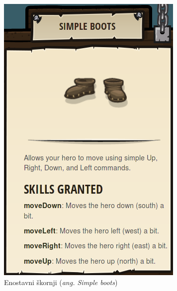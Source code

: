  \begin{figure}[h!]
    \centering
    \begin{subfigure}[]{0.25\textwidth}
      \includegraphics[width=\textwidth]{./images/sc_web/cc_EQ-SB-v01.png}
        \caption{Enostavni škornji (\emph{ang. Simple boots})}
        \label{fig:cc:eq:sb}
      \end{subfigure}
      \qquad
    \begin{subfigure}[]{0.25\textwidth}

\end{subfigure}
\end{figure}

